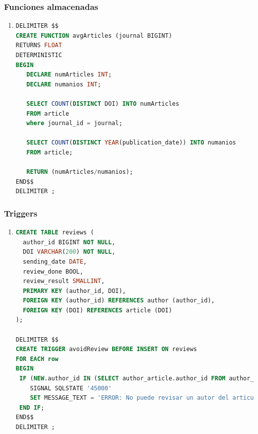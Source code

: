 \documentclass{db-practice}
\begin{document}
\subsubsection*{Funciones almacenadas}
\begin{enumerate}
\item
\begin{lstlisting}[language=SQL]
DELIMITER $$
CREATE FUNCTION avgArticles (journal BIGINT)
RETURNS FLOAT
DETERMINISTIC
BEGIN
   DECLARE numArticles INT;
   DECLARE numanios INT;
      
   SELECT COUNT(DISTINCT DOI) INTO numArticles
   FROM article
   where journal_id = journal;
   
   SELECT COUNT(DISTINCT YEAR(publication_date)) INTO numanios
   FROM article;
   
   RETURN (numArticles/numanios);
END$$   
DELIMITER ;
\end{lstlisting}
\end{enumerate}

\subsubsection*{Triggers}
\begin{enumerate}
\item
\begin{lstlisting}[language=SQL]
CREATE TABLE reviews (
  author_id BIGINT NOT NULL,
  DOI VARCHAR(200) NOT NULL,
  sending_date DATE,
  review_done BOOL,
  review_result SMALLINT,
  PRIMARY KEY (author_id, DOI),
  FOREIGN KEY (author_id) REFERENCES author (author_id),
  FOREIGN KEY (DOI) REFERENCES article (DOI)
);

DELIMITER $$
CREATE TRIGGER avoidReview BEFORE INSERT ON reviews
FOR EACH row
BEGIN
 IF (NEW.author_id IN (SELECT author_article.author_id FROM author_article WHERE DOI = NEW.DOI)) THEN
    SIGNAL SQLSTATE '45000'
    SET MESSAGE_TEXT = 'ERROR: No puede revisar un autor del articulo';
 END IF;
END$$
DELIMITER ;  
\end{lstlisting} 
\end{enumerate}
\end{document}
